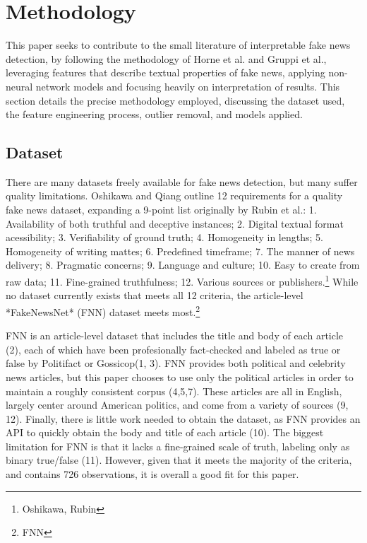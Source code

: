 \documentclass[../thesis.tex]{subfiles}
\begin{document}
\chapter{Methodology}
\label{ch:methods}

This paper seeks to contribute to the small literature of interpretable fake news detection, by following the methodology of Horne et al. and Gruppi et al., leveraging features that describe textual properties of fake news, applying non-neural network models and focusing heavily on interpretation of results. This section details the precise methodology employed, discussing the dataset used, the feature engineering process, outlier removal, and models applied.

\section{Dataset}

There are many datasets freely available for fake news detection, but many suffer quality limitations. Oshikawa and Qiang outline 12 requirements for a quality fake news dataset, expanding a 9-point list originally by Rubin et al.: 1. Availability of both truthful and deceptive instances; 2. Digital textual format acessibility; 3. Verifiability of ground truth; 4. Homogeneity in lengths; 5. Homogeneity of writing mattes; 6. Predefined timeframe; 7. The manner of news delivery; 8. Pragmatic concerns; 9. Language and culture; 10. Easy to create from raw data; 11. Fine-grained truthfulness; 12. Various sources or publishers.\footnote{Oshikawa, Rubin} While no dataset currently exists that meets all 12 criteria, the article-level *FakeNewsNet* (FNN) dataset meets most.\footnote{FNN}

FNN is an article-level dataset that includes the title and body of each article (2), each of which have been profesionally fact-checked and labeled as true or false by Politifact or Gossicop(1, 3). FNN provides both political and celebrity news articles, but this paper chooses to use only the political articles in order to maintain a roughly consistent corpus (4,5,7). These articles are all in English, largely center around American politics, and come from a variety of sources (9, 12). Finally, there is little work needed to obtain the dataset, as FNN provides an API to quickly obtain the body and title of each article (10). The biggest limitation for FNN is that it lacks a fine-grained scale of truth, labeling only as binary true/false (11). However, given that it meets the majority of the criteria, and contains 726 observations, it is overall a good fit for this paper.
\end{document}
